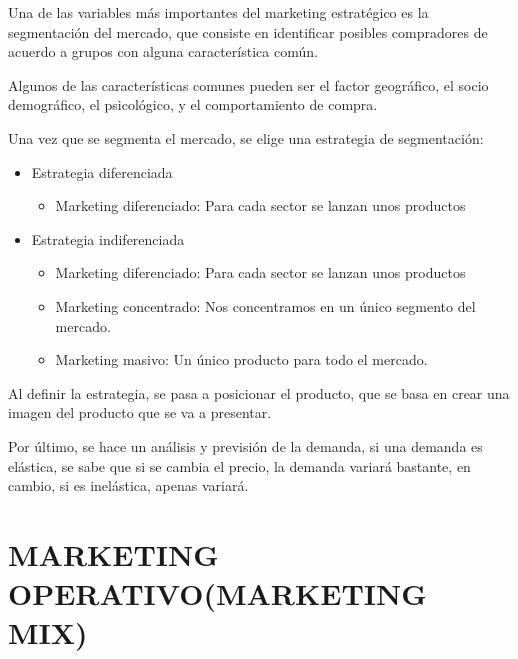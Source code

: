 \documentclass[12pt, twoside, openright]{report} %
\begin{document}
Una de las variables más importantes del marketing estratégico es la segmentación del mercado,
que consiste en identificar posibles compradores de acuerdo a grupos con alguna característica
común.

Algunos de las características comunes pueden ser el factor geográfico, el socio demográfico, el
psicológico, y el comportamiento de compra.

Una vez que se segmenta el mercado, se elige una estrategia de segmentación:
\begin{itemize}
	\item Estrategia diferenciada
	\begin{itemize}
		\item Marketing diferenciado: Para cada sector se lanzan unos productos
	\end{itemize}
	\item Estrategia indiferenciada
	\begin{itemize}
		\item Marketing diferenciado: Para cada sector se lanzan unos productos
		\item Marketing concentrado: Nos concentramos en un único segmento del mercado.
		\item Marketing masivo: Un único producto para todo el mercado.
	\end{itemize}
\end{itemize}

Al definir la estrategia, se pasa a posicionar el producto, que se basa en crear una imagen del
producto que se va a presentar.

Por último, se hace un análisis y previsión de la demanda, si una demanda es elástica, se sabe que si
se cambia el precio, la demanda variará bastante, en cambio, si es inelástica, apenas variará.

\section{MARKETING OPERATIVO(MARKETING MIX)}
\end{document}
